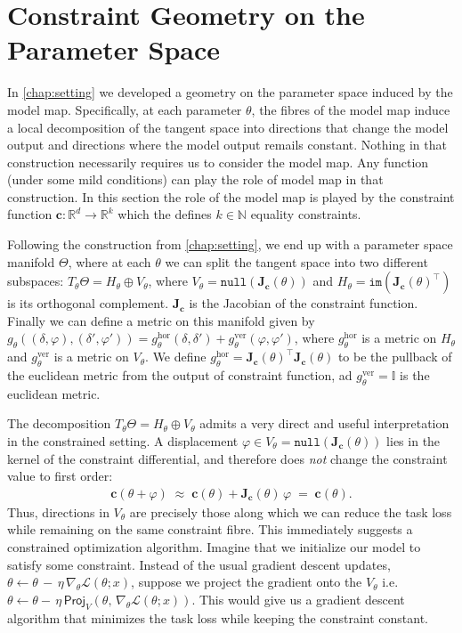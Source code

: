 \section{Constraint Geometry on the Parameter Space}
\label{sec:constr_geometry}
In \cref{chap:setting} we developed a geometry on the parameter space induced by the model map. Specifically, at each parameter $\theta$, the fibres of the model map induce a local decomposition of the tangent space into directions that change the model output and directions where the model output remails constant. Nothing in that construction necessarily requires us to consider the model map. Any function (under some mild conditions) can play the role of model map in that construction. In this section the role of the model map is played by the constraint function $\mathbf{c}: \mathbb{R}^d \to \mathbb{R}^k$ which the defines $k \in \mathbb{N}$ equality constraints.

Following the construction from \cref{chap:setting}, we end up with a parameter space manifold $\Theta$, where at each $\theta$ we can split the tangent space into two different subspaces: $T_\theta\Theta = H_\theta \oplus V_\theta$, where $V_\theta = \texttt{null}(\mathbf{J}_\mathbf{c}(\theta))$ and $H_\theta = \texttt{im}(\mathbf{J}_\mathbf{c}(\theta)^\top)$ is its orthogonal complement. $\mathbf{J}_\mathbf{c}$ is the Jacobian of the constraint function. Finally we can define a metric on this manifold given by $ g_\theta((\delta,\varphi), (\delta', \varphi')) = g^{\mathrm{hor}}_\theta(\delta, \delta') + g^{\mathrm{ver}}_\theta(\varphi, \varphi')$, where $g^{\mathrm{hor}}_\theta$ is a metric on $H_\theta$ and $g^{\mathrm{ver}}_\theta$ is a metric on $V_\theta$. We define $g^{\mathrm{hor}}_\theta = \mathbf{J}_\mathbf{c}(\theta)^\top \mathbf{J}_\mathbf{c}(\theta)$ to be the pullback of the euclidean metric from the output of constraint function, ad $g^{\mathrm{ver}}_\theta = \mathbb{I}$ is the euclidean metric.


The decomposition $T_\theta\Theta = H_\theta \oplus V_\theta$ admits a very direct and useful interpretation in the constrained setting.
A displacement $\varphi\in V_\theta=\texttt{null}(\mathbf{J}_{\mathbf c}(\theta))$ lies in the kernel of the constraint differential, and therefore does \emph{not} change the constraint value to first order:
\begin{align}
\mathbf c(\theta+\varphi)
\;\approx\;
\mathbf c(\theta) + \mathbf{J}_{\mathbf c}(\theta)\,\varphi
\;=\;
\mathbf c(\theta).
\end{align}
Thus, directions in $V_\theta$ are precisely those along which we can reduce the task loss while remaining on the same constraint fibre. This immediately suggests a constrained optimization algorithm. Imagine that we initialize our model to satisfy some constraint. Instead of the usual gradient descent updates, $\theta \leftarrow \theta  \,-  \,\eta  \,\nabla_\theta \mathcal{L}(\theta ; x)$, suppose we project the gradient onto the $V_\theta$ i.e. $\theta \leftarrow \theta - \,\eta \, \textsf{Proj}_V(\theta, \,\nabla_\theta \mathcal{L}(\theta ; x))$. This would give us a gradient descent algorithm that minimizes the task loss while keeping the constraint constant. 

